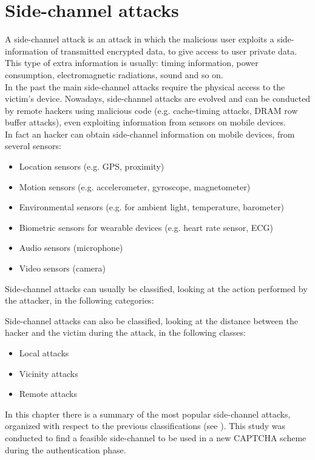 \chapter{Side-channel attacks}\label{chapter:SideCH}
A side-channel attack is an attack in which the malicious user exploits a side-information of transmitted encrypted data, to give access to user private data. 
This type of extra information is usually: timing information, power consumption, electromagnetic radiations, sound and so on.\\
In the past the main side-channel attacks require the physical access to the victim's device. Nowadays, side-channel attacks are evolved and can be conducted by remote hackers using malicious code (e.g. cache-timing attacks, DRAM row buffer attacks), even exploiting information from sensors on mobile devices\cite{side_classification}.\\
In fact an hacker can obtain side-channel information on mobile devices, from several sensors\cite{side_attacks}:
\begin{itemize}
\item{Location sensors (e.g. GPS, proximity)}
\item{Motion sensors (e.g. accelerometer, gyroscope, magnetometer)}
\item{Environmental sensors (e.g. for ambient light, temperature, barometer)}
\item{Biometric sensors for wearable devices (e.g. heart rate sensor, ECG)}
\item{Audio sensors (microphone)}
\item{Video sensors (camera)}
\end{itemize}
Side-channel attacks can usually be classified, looking at the action performed by the attacker, in the following categories:
\begin{itemize}
\end{itemize}
Side-channel attacks can also be classified, looking at the distance between the hacker and the victim during the attack, in the following classes:
\begin{itemize}
\item{Local attacks}
\item{Vicinity attacks}
\item{Remote attacks}
\end{itemize}
In this chapter there is a summary of the most popular side-channel attacks, organized with respect to the previous classifications (see ). This study was conducted to find a feasible side-channel to be used in a new CAPTCHA scheme during the authentication phase.

